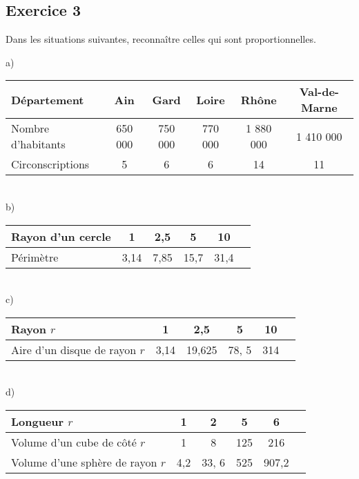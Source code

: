 \documentclass[12 pt]{extarticle}
\theoremstyle{plain}
\begin{document}
\subsection*{Exercice 3}

Dans les situations suivantes, reconnaître celles qui sont proportionnelles. 

a) \begin{tabular}{|l | c |c | c| c|c| }\hline
Département & Ain & Gard & Loire & Rhône & Val-de-Marne\\
\hline
Nombre d'habitants & 650 000 & 750 000  & 770 000 & 1 880 000 &1 410 000 \\
Circonscriptions & 5 & 6 & 6 & 14 & 11 \\ \hline
\end{tabular} 

 \ \\ 
 
b) \begin{tabular}{|l | c | c | c | c | c}
\hline
Rayon d'un cercle & 1 & 2,5 &  5 & 10 \\
\hline
Périmètre & 3,14 &7,85 & 15,7& 31,4\\ \hline

\end{tabular}

 \ \\ 
 
 
c) \begin{tabular}{|l | c | c | c | c | c}
\hline
Rayon $r$ & 1 & 2,5 &  5 & 10 \\
\hline
Aire d'un disque de rayon $r$ & 3,14 & 19,625 & 78, 5& 314\\ \hline

\end{tabular}

 \ \\ 
 
d) \begin{tabular}{|l | c | c | c | c | c}
\hline
Longueur $r$ & 1 & 2 &  5 & 6 \\
\hline
Volume d'un cube de côté $r$ & 1 & 8 & 125 & 216 \\ \hline
Volume d'une sphère de rayon $r$ & 4,2 & 33, 6 & 525& 907,2\\ \hline

\end{tabular}
 
 
\end{document}
